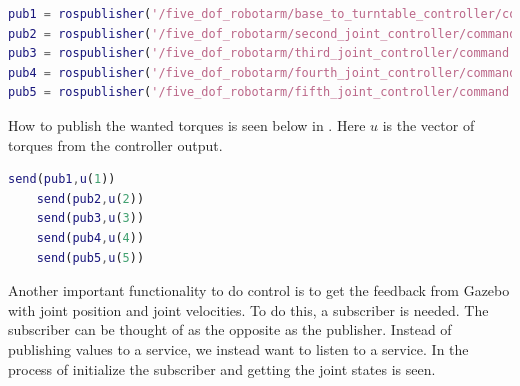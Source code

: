 \begin{lstlisting}[language=Matlab,caption={MATLAB code for creating the publishers.},label={lst:matlabPubl}]
pub1 = rospublisher('/five_dof_robotarm/base_to_turntable_controller/command','std_msgs/Float64');
pub2 = rospublisher('/five_dof_robotarm/second_joint_controller/command','std_msgs/Float64');
pub3 = rospublisher('/five_dof_robotarm/third_joint_controller/command','std_msgs/Float64');
pub4 = rospublisher('/five_dof_robotarm/fourth_joint_controller/command','std_msgs/Float64');
pub5 = rospublisher('/five_dof_robotarm/fifth_joint_controller/command','std_msgs/Float64');
\end{lstlisting}

How to publish the wanted torques is seen below in . Here $u$ is the vector of torques from the controller output. 
\begin{lstlisting}[language=Matlab,caption={MATLAB code for publish wanted joint torques},label={lst:matlabPubs}]
    send(pub1,u(1))
    send(pub2,u(2))
    send(pub3,u(3))
    send(pub4,u(4))
    send(pub5,u(5))
\end{lstlisting}

Another important functionality to do control is to get the feedback from Gazebo with joint position and joint velocities. To do this, a subscriber is needed. The subscriber can be thought of as the opposite as the publisher. Instead of publishing values to a service, we instead want to listen to a service. In  the process of initialize the subscriber and getting the joint states is seen. 
